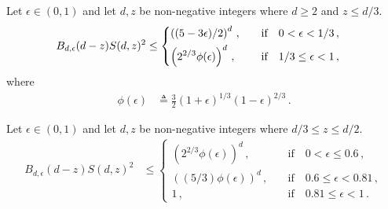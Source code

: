 \begin{claim}\label{claim:t1star-variance-exact}
  Let $\epsilon \in (0,1)$ and 
  let $d,z$ be non-negative integers where $d \geq 2$ and $z \leq d/3$. 
  \begin{align*}
    B_{d, \epsilon}(d-z) S(d,z)^2
    &\leq \begin{dcases} 
    \left( (5-3 \epsilon)/2 \right)^d \,,
        &\quad \text{if}\quad
        0 < \epsilon < 1/3 \,, \\
    \left( 2^{2/3} \phi(\epsilon) \right)^d \,,
        &\quad \text{if}\quad
        1/3 \leq \epsilon < 1 \, ,
    \end{dcases}
  \end{align*}
  where
  \begin{align}
    \phi(\epsilon) 
    &\triangleq \frac{3}{2} (1+\epsilon)^{1/3} (1-\epsilon)^{2/3}\label{eq:phi_eps} 
    \,.
  \end{align}
\end{claim}

\begin{claim}\label{claim:t2star-variance-exact}
  Let $\epsilon \in (0,1)$ and 
  let $d,z$ be non-negative integers where $d/3 \leq z \leq d/2$. 
  \begin{align*}
    B_{d, \epsilon}(d-z) S(d,z)^2
    &\leq \begin{cases} 
    \left( 2^{2/3} \phi(\epsilon) \right)^d \,,
        &\quad\text{if}\quad 0 < \epsilon \leq 0.6\,, \\
    \left( (5/3) \phi(\epsilon)  \right)^d \,,
        &\quad\text{if}\quad 0.6\leq \epsilon < 0.81\,, \\
    1 \,,
        &\quad\text{if}\quad 0.81 \leq \epsilon < 1
        \,.
    \end{cases}
  \end{align*}
\end{claim}



